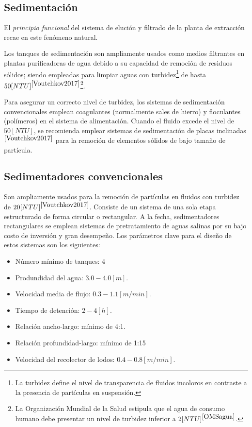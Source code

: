\begin{center}
	\section{Sedimentaci\'on}
\end{center}

\noindent
\justify

El \textit{principio funcional} del sistema de eluci\'on y filtrado de la planta de extracci\'on recae en este fen\'omeno natural.

\noindent
\justify

Los tanques de sedimentaci\'on son ampliamente usados como medios filtrantes en plantas purificadoras de agua debido a su capacidad de remoci\'on de residuos s\'olidos; siendo empleadas para limpiar aguas con turbidez\footnote{La turbidez define el nivel de transparencia de fluidos incoloros en contraste a la presencia de part\'iculas en suspensi\'on.} de hasta $50 [NTU]^{\cite{Voutchkov2017}}$\footnote{La Organizaci\'on Mundial de la Salud estipula que el agua de consumo humano debe presentar un nivel de turbidez inferior a $2 [NTU]^{\cite{OMSagua}}$.}. 

\noindent
\justify

Para asegurar un correcto nivel de turbidez, los sistemas de sedimentaci\'on convencionales emplean coagulantes (normalmente sales de hierro) y floculantes (pol\'imeros) en el sistema de alimentaci\'on. Cuando el fluido excede el nivel de $50 [NTU]$, se recomienda emplear sistemas de sedimentaci\'on de placas inclinadas$^{\cite{Voutchkov2017}}$ para la remoci\'on de elementos s\'olidos de bajo tama\~no de part\'icula.


\subsection{Sedimentadores convencionales}

\noindent
\justify

Son ampliamente usados para la remoci\'on de part\'iculas en fluidos con turbidez de $20 [NTU]^{\cite{Voutchkov2017}}$. Consiste de un sistema de una sola etapa estructurado de forma circular o rectangular. A la fecha, sedimentadores rectangulares se emplean sistemas de pretratamiento de aguas salinas por su bajo costo de inversi\'on y gran desempe\~no. Los par\'ametros clave para el dise\~no de estos sistemas son los siguientes:

\begin{itemize}
	\item N\'umero m\'inimo de tanques: 4
	\item Produndidad del agua: $3.0 - 4.0 [m]$.
	\item Velocidad media de flujo: $0.3 - 1.1 [m/min]$.
	\item Tiempo de detenci\'on: $2 - 4 [h]$.
	\item Relaci\'on ancho-largo: m\'inimo de 4:1.
	\item Relaci\'on profundidad-largo: m\'inimo de 1:15 
	\item Velocidad del recolector de lodos: $0.4 - 0.8 [m/min]$.
\end{itemize}

